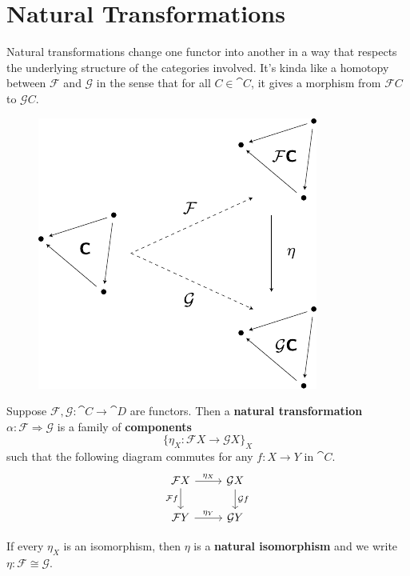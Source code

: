 \documentclass[twoside,10pt]{report}
\begin{document}

\section{Natural Transformations}

Natural transformations change one functor into another in a way that respects the underlying structure of the categories involved. It's kinda like a homotopy between $\mathcal{F}$ and $\mathcal{G}$ in the sense that for all $C \in \cat{C}$, it gives a morphism from $\mathcal{F}C$ to $\mathcal{G}C$.
\begin{figure}[H]
	\centering
	\includegraphics[scale=1]{fig/nat-trans.pdf}
\end{figure}

\begin{defn}
Suppose $\mathcal{F},\mathcal{G}:\cat{C}\to \cat{D}$ are functors. Then a \textbf{natural transformation} $\alpha:\mathcal{F}\Rightarrow \mathcal{G}$ is a family of \textbf{components}
\[
	\{ \eta_X: \mathcal{F}X \to \mathcal{G}X\}_X
\] such that the following diagram commutes for any $f:X\to Y$ in $\cat{C}$.
\[
\begin{tikzcd}
	\mathcal{F}X \rar{\eta_{X}} \arrow[d, "\mathcal{F}f"'] & \mathcal{G}X \dar{\mathcal{G}f} \\
	\mathcal{F}Y \rar{\eta_{Y}} & \mathcal{G}Y
\end{tikzcd}
\] 
\end{defn}
If every $\eta_{X}$ is an isomorphism, then $\eta$ is a \textbf{natural isomorphism} and we write $\eta: \mathcal{F} \cong \mathcal{G}$.


\end{document}
